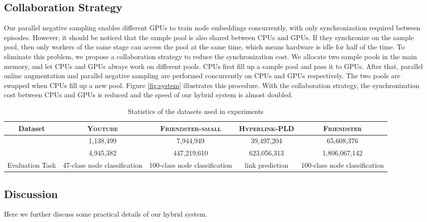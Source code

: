 \documentclass[sigconf]{acmart}
\newcommand{\dataset}[1]{\textsc{#1}\xspace}
\begin{document}
\subsection{Collaboration Strategy}
\label{ref:collaboration_strategy}

Our parallel negative sampling enables different GPUs to train node embeddings concurrently, with only synchronization required between episodes. However, it should be noticed that the sample pool is also shared between CPUs and GPUs. If they synchronize on the sample pool, then only workers of the same stage can access the pool at the same time, which means hardware is idle for half of the time. To eliminate this problem, we propose a collaboration strategy to reduce the synchronization cost. We allocate two sample pools in the main memory, and let CPUs and GPUs always work on different pools. CPUs first fill up a sample pool and pass it to GPUs. After that, parallel online augmentation and parallel negative sampling are performed concurrently on CPUs and GPUs respectively. The two pools are swapped when CPUs fill up a new pool. Figure \ref{fig:system} illustrates this procedure. With the collaboration strategy, the synchronization cost between CPUs and GPUs is reduced and the speed of our hybrid system is almost doubled.

\begin{table*}
    \centering
    \begin{tabular}{ccccc}
        \toprule
        Dataset         & \dataset{Youtube}             & \dataset{Friendster-small}    & \dataset{Hyperlink-PLD}   & \dataset{Friendster}          \\
        \midrule
                   & 1,138,499                     & 7,944,949                     & 39,497,204                & 65,608,376                    \\
                   & 4,945,382                     & 447,219,610                   & 623,056,313               & 1,806,067,142                 \\
        Evaluation Task & 47-class node classification  & 100-class node classification & link prediction           & 100-class node classification \\
        \bottomrule
    \end{tabular}
    \caption{Statistics of the datasets used in experiments}
    \label{tab:datasets}
\end{table*}

\subsection{Discussion}
Here we further discuss some practical details of our hybrid system.
\end{document}
